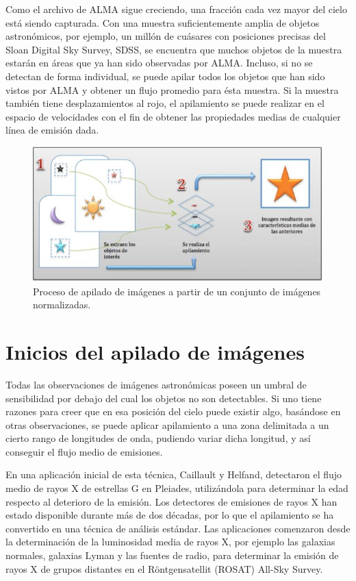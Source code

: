 Como el archivo de ALMA sigue creciendo, una fracción cada vez mayor
del cielo está siendo capturada. Con una muestra suficientemente
amplia de objetos astronómicos, por ejemplo, un millón de cuásares con
posiciones precisas del Sloan Digital Sky Survey, SDSS, se encuentra
que muchos objetos de la muestra estarán en áreas que ya han sido
observadas por ALMA. Incluso, si no se detectan de forma individual,
se puede apilar todos los objetos que han sido vistos por ALMA y
obtener un flujo promedio para ésta muestra. Si la muestra también
tiene desplazamientos al rojo, el apilamiento se puede realizar en el
espacio de velocidades con el fin de obtener las propiedades medias de
cualquier línea de emisión dada.

\begin{figure}[hb!]
  \begin{center}
    \includegraphics[scale=.5]{image/apilado}
  \end{center}
  \caption{Proceso de apilado de imágenes a partir de un conjunto de
  imágenes normalizadas.}
\end{figure}

\section{Inicios del apilado de imágenes}

Todas las observaciones de imágenes astronómicas poseen un umbral de
sensibilidad por debajo del cual los objetos no son detectables. Si
uno tiene razones para creer que en esa posición del cielo puede
existir algo, basándose en otras observaciones, se puede aplicar
apilamiento a una zona delimitada a un cierto rango de longitudes de
onda, pudiendo variar dicha longitud, y así conseguir el flujo medio
de emisiones.

En una aplicación inicial de esta técnica, Caillault y Helfand,
detectaron el flujo medio de rayos X de estrellas G en Pleiades,
utilizándola para determinar la edad respecto al deterioro de la
emisión. Los detectores de emisiones de rayos X han estado disponible
durante más de dos décadas, por lo que el apilamiento se ha convertido
en una técnica de análisis estándar. Las aplicaciones comenzaron desde
la determinación de la luminosidad media de rayos X, por ejemplo las
galaxias normales, galaxias Lyman y las fuentes de radio, para
determinar la emisión de rayos X de grupos distantes en el
Röntgensatellit (ROSAT) All-Sky Survey.

